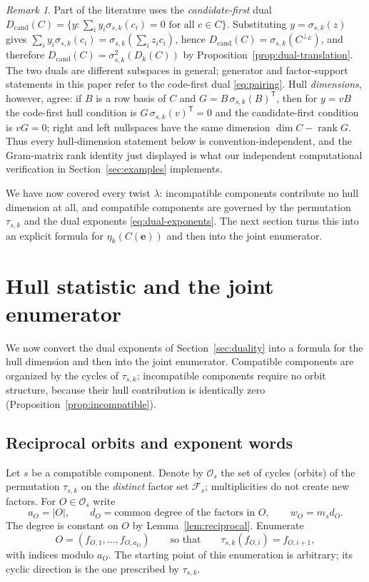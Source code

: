 \documentclass[11pt,a4paper]{article}
\newcommand{\Fs}{\mathcal F_s}
\newcommand{\Os}{\mathcal O_s}
\newcommand{\rank}{\operatorname{rank}}
\newcommand{\Dk}{D_k}
\newcommand{\perpE}{\perp_{E}}
\numberwithin{equation}{section}
\theoremstyle{plain}
\theoremstyle{definition}
\theoremstyle{remark}
\newtheorem{remark}[theorem]{Remark}
\begin{document}
\begin{remark}\label{rem:candidate}
Part of the literature uses the \emph{candidate-first} dual
$D_{\mathrm{cand}}(C)=\{y:\sum_i y_i\sigma_{s,k}(c_i)=0\text{ for all }c\in C\}$.
Substituting $y=\sigma_{s,k}(z)$ gives
$\sum_i y_i\sigma_{s,k}(c_i)=\sigma_{s,k}(\sum_i z_ic_i)$, hence
$D_{\mathrm{cand}}(C)=\sigma_{s,k}(C^{\perpE})$, and therefore
$D_{\mathrm{cand}}(C)=\sigma_{s,k}^2(\Dk(C))$ by
Proposition~\ref{prop:dual-translation}.  The two duals are different subspaces
in general; generator and factor-support statements in this paper refer to the
code-first dual \eqref{eq:pairing}.  Hull \emph{dimensions}, however, agree:
if $B$ is a row basis of $C$ and $G=B\,\sigma_{s,k}(B)^{\mathsf T}$, then for
$y=vB$ the code-first hull condition is $G\,\sigma_{s,k}(v)^{\mathsf T}=0$ and
the candidate-first condition is $vG=0$; right and left nullspaces have the
same dimension $\dim C-\rank G$.  Thus every hull-dimension statement below is
convention-independent, and the Gram-matrix rank identity just displayed is
what our independent computational verification in
Section~\ref{sec:examples} implements.
\end{remark}

We have now covered every twist $\lambda$: incompatible components contribute
no hull dimension at all, and compatible components are governed by the
permutation $\tau_{s,k}$ and the dual exponents
\eqref{eq:dual-exponents}.  The next section turns this into an explicit
formula for $\eta_k(C(\mathbf{e}))$ and then into the joint enumerator.

\section{Hull statistic and the joint enumerator}\label{sec:enumerator}

We now convert the dual exponents of Section~\ref{sec:duality} into a formula
for the hull dimension and then into the joint enumerator.  Compatible
components are organized by the cycles of $\tau_{s,k}$; incompatible components
require no orbit structure, because their hull contribution is identically zero
(Proposition~\ref{prop:incompatible}).

\subsection{Reciprocal orbits and exponent words}\label{sec:orbits}

Let $s$ be a compatible component.  Denote by $\Os$ the set of cycles
(orbits) of the permutation $\tau_{s,k}$ on the \emph{distinct} factor set
$\Fs$; multiplicities do not create new factors.  For $O\in\Os$ write
\[
a_O=|O|,\qquad d_O=\text{common degree of the factors in }O,\qquad
w_O=m_sd_O .
\]
The degree is constant on $O$ by Lemma~\ref{lem:reciprocal}.  Enumerate
\[
O=(f_{O,1},\ldots,f_{O,a_O})
\qquad\text{so that}\qquad
\tau_{s,k}(f_{O,i})=f_{O,i+1},
\]
with indices modulo $a_O$.  The starting point of this enumeration is arbitrary;
its cyclic direction is the one prescribed by $\tau_{s,k}$.
\end{document}
